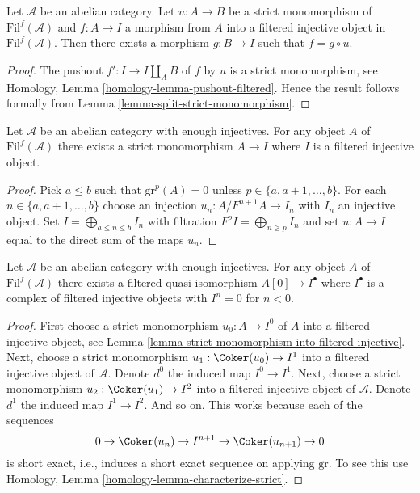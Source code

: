 \begin{lemma}
\label{lemma-injective-property-filtered-injective}
Let $\mathcal{A}$ be an abelian category.
Let $u : A \to B$ be a strict monomorphism
of $\text{Fil}^f(\mathcal{A})$
and $f : A \to I$ a morphism from $A$ into a filtered injective object
in $\text{Fil}^f(\mathcal{A})$.
Then there exists a morphism $g : B \to I$ such that $f = g \circ u$.
\end{lemma}

\begin{proof}
The pushout $f' : I \to I \amalg_A B$ of $f$ by $u$ is a strict
monomorphism, see
Homology, Lemma \ref{homology-lemma-pushout-filtered}.
Hence the result follows formally from
Lemma \ref{lemma-split-strict-monomorphism}.
\end{proof}

\begin{lemma}
\label{lemma-strict-monomorphism-into-filtered-injective}
Let $\mathcal{A}$ be an abelian category with enough injectives.
For any object $A$ of $\text{Fil}^f(\mathcal{A})$ there exists
a strict monomorphism $A \to I$
where $I$ is a filtered injective object.
\end{lemma}

\begin{proof}
Pick $a \leq b$ such that $\text{gr}^p(A) = 0$ unless
$p \in \{a, a + 1, \ldots, b\}$. For each
$n \in \{a, a + 1, \ldots, b\}$ choose an injection
$u_n : A/F^{n + 1}A \to I_n$ with $I_n$ an injective object.
Set $I = \bigoplus_{a \leq n \leq b} I_n$ with filtration
$F^pI = \bigoplus_{n \geq p} I_n$ and set $u : A \to I$ equal to
the direct sum of the maps $u_n$.
\end{proof}

\begin{lemma}
\label{lemma-filtered-injective-right-resolution-single-object}
Let $\mathcal{A}$ be an abelian category with enough injectives.
For any object $A$ of $\text{Fil}^f(\mathcal{A})$ there exists
a filtered quasi-isomorphism $A[0] \to I^\bullet$
where $I^\bullet$ is a complex of filtered injective objects
with $I^n = 0$ for $n < 0$.
\end{lemma}

\begin{proof}
First choose a strict monomorphism $u_0 : A \to I^0$ of $A$ into a filtered
injective object, see
Lemma \ref{lemma-strict-monomorphism-into-filtered-injective}.
Next, choose a strict monomorphism
$u_1 : \Coker(u_0) \to I^1$ into a filtered injective object of
$\mathcal{A}$. Denote $d^0$ the induced map $I^0 \to I^1$.
Next, choose a strict monomorphism $u_2 : \Coker(u_1) \to I^2$ into
a filtered injective object of $\mathcal{A}$. Denote $d^1$ the induced
map $I^1 \to I^2$. And so on. This works because each
of the sequences
$$
0 \to \Coker(u_n) \to I^{n + 1} \to \Coker(u_{n + 1}) \to 0
$$
is short exact, i.e., induces a short exact sequence on applying
$\text{gr}$. To see this use
Homology, Lemma \ref{homology-lemma-characterize-strict}.
\end{proof}

